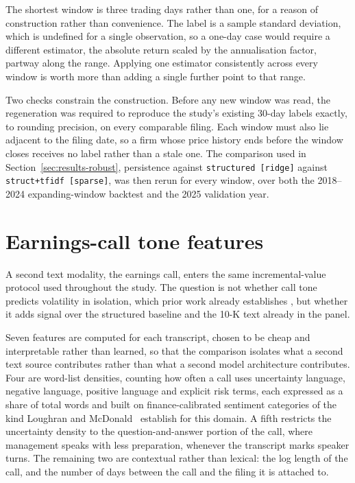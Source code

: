 \documentclass[logo,msc,ai]{infthesis}        %
\begin{document}
The shortest window is three trading days rather than one, for a reason of construction rather than convenience. The label is a sample standard deviation, which is undefined for a single observation, so a one-day case would require a different estimator, the absolute return scaled by the annualisation factor, partway along the range. Applying one estimator consistently across every window is worth more than adding a single further point to that range.

Two checks constrain the construction. Before any new window was read, the regeneration was required to reproduce the study's existing 30-day labels exactly, to rounding precision, on every comparable filing. Each window must also lie adjacent to the filing date, so a firm whose price history ends before the window closes receives no label rather than a stale one. The comparison used in Section~\ref{sec:results-robust}, persistence against \texttt{structured [ridge]} against \texttt{struct+tfidf [sparse]}, was then rerun for every window, over both the 2018--2024 expanding-window backtest and the 2025 validation year.

\section{Earnings-call tone features}
\label{sec:calls-method}
A second text modality, the earnings call, enters the same incremental-value protocol used throughout the study. The question is not whether call tone predicts volatility in isolation, which prior work already establishes \cite{qin2019you,yang2020html,sawhney2020voltage}, but whether it adds signal over the structured baseline and the 10-K text already in the panel.

Seven features are computed for each transcript, chosen to be cheap and interpretable rather than learned, so that the comparison isolates what a second text source contributes rather than what a second model architecture contributes. Four are word-list densities, counting how often a call uses uncertainty language, negative language, positive language and explicit risk terms, each expressed as a share of total words and built on finance-calibrated sentiment categories of the kind Loughran and McDonald~\cite{loughran2011liability} establish for this domain. A fifth restricts the uncertainty density to the question-and-answer portion of the call, where management speaks with less preparation, whenever the transcript marks speaker turns. The remaining two are contextual rather than lexical: the log length of the call, and the number of days between the call and the filing it is attached to.
\end{document}
